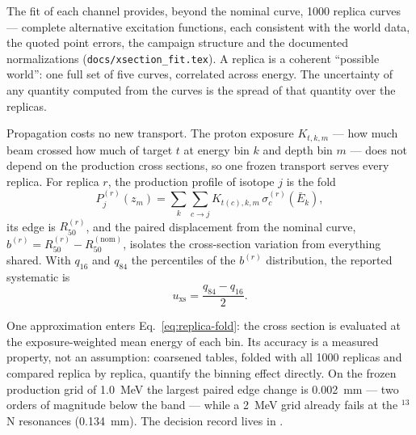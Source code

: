 \documentclass[11pt]{article}
\newcommand{\generateddir}{docs/generated/sampling_xsections}
\newcommand{\generateddir}{generated/sampling_xsections}
\newcommand{\file}[1]{\texttt{#1}}
\begin{document}
The fit of each channel provides, beyond the nominal curve, 1000 replica
curves --- complete alternative excitation functions, each consistent with
the world data, the quoted point errors, the campaign structure and the
documented normalizations (\file{docs/xsection\_fit.tex}).  A replica is a
coherent ``possible world'': one full set of five curves, correlated across
energy.  The uncertainty of any quantity computed from the curves is the
spread of that quantity over the replicas.

Propagation costs no new transport.  The proton exposure
$K_{t,k,m}$ --- how much beam crossed how much of target $t$ at energy bin
$k$ and depth bin $m$ --- does not depend on the production cross sections,
so one frozen transport serves every replica.  For replica $r$, the
production profile of isotope $j$ is the fold
\begin{equation}
  P_j^{(r)}(z_m) = \sum_{k}\sum_{c\to j} K_{t(c),k,m}\,
  \sigma_c^{(r)}(\bar E_{k}),
  \label{eq:replica-fold}
\end{equation}
its edge is $R_{50}^{(r)}$, and the paired displacement from the nominal
curve, $b^{(r)} = R_{50}^{(r)}-R_{50}^{(\mathrm{nom})}$, isolates the
cross-section variation from everything shared.  With $q_{16}$ and $q_{84}$
the percentiles of the $b^{(r)}$ distribution, the reported systematic is
\begin{equation}
  u_{\mathrm{xs}}=\frac{q_{84}-q_{16}}{2}.
  \label{eq:uxs}
\end{equation}

One approximation enters Eq.~\eqref{eq:replica-fold}: the cross section is
evaluated at the exposure-weighted mean energy of each bin.  Its accuracy is
a measured property, not an assumption: coarsened tables, folded with all
1000 replicas and compared replica by replica, quantify the binning effect
directly.  On the frozen production grid of \SI{1.0}{MeV} the largest
paired edge change is \SI{0.002}{mm} --- two orders of magnitude below the
band --- while a \SI{2}{MeV} grid already fails at the $^{13}$N resonances
(\SI{0.134}{mm}).  The decision record lives in
.

\begin{table}[htbp]
\centering
\caption{The data-driven distal edges and their cross-section systematic
$u_{\mathrm{xs}}$ (Eq.~\eqref{eq:uxs}), from the 1000-replica fold of the
standard field.}
\label{tab:band}

\end{table}
\end{document}
